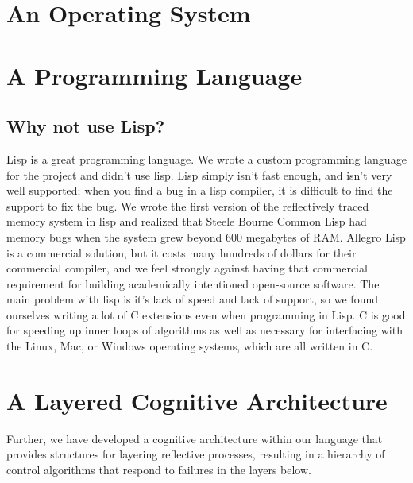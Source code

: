 \section{An Operating System}

\section{A Programming Language}



\subsection{Why not use Lisp?}

Lisp is a great programming language.  We wrote a custom programming
language for the project and didn't use lisp.  Lisp simply isn't fast
enough, and isn't very well supported; when you find a bug in a lisp
compiler, it is difficult to find the support to fix the bug.  We
wrote the first version of the reflectively traced memory system in
lisp and realized that Steele Bourne Common Lisp had memory bugs when
the system grew beyond 600 megabytes of RAM.  Allegro Lisp is a
commercial solution, but it costs many hundreds of dollars for their
commercial compiler, and we feel strongly against having that
commercial requirement for building academically intentioned
open-source software.  The main problem with lisp is it's lack of
speed and lack of support, so we found ourselves writing a lot of C
extensions even when programming in Lisp.  C is good for speeding up
inner loops of algorithms as well as necessary for interfacing with
the Linux, Mac, or Windows operating systems, which are all written in
C.

\section{A Layered Cognitive Architecture}

Further, we have developed a cognitive architecture within our
language that provides structures for layering reflective processes,
resulting in a hierarchy of control algorithms that respond to
failures in the layers below.

